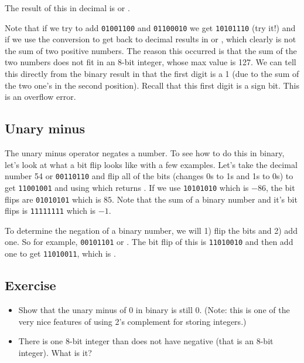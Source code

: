 The result of this in decimal is  or  \printpythontex[verb]. 


Note that if we try to add \verb!01001100! and \verb!01100010! we get \verb!10101110! (try it!) and if we use the conversion to get back to decimal results in  or  \printpythontex[verb], which clearly is not the sum of two positive numbers.  The reason this occurred is that the sum of the two numbers does not fit in an 8-bit integer, whose max value is 127.  We can tell this directly from the binary result in that the first digit is a 1 (due to the sum of the two one's in the second position).  Recall that this first digit is a sign bit.  This is an overflow error.  

\subsection{Unary minus}


The unary minus operator negates a number.  To see how to do this in binary, let's look at what a bit flip looks like with a few examples.  Let's take the decimal number 54 or \verb!00110110! and flip all of the bits (changes 0s to 1s and 1s to 0s) to get \verb!11001001! and using   which returns \printpythontex[verb]. If we use \verb!10101010! which is $-86$, the bit flips are \verb!01010101! which is $85$.  Note that the sum of a binary number and it's bit flips is \verb!11111111! which is $-1$. 

To determine the negation of a binary number, we will 1) flip the bits and 2) add one.  So for example, 
\verb!00101101! or  \printpythontex[verb].  The bit flip of this is \verb!11010010! and then add one to get \verb!11010011!, which is  \printpythontex[verb].


\subsection{Exercise}

\begin{itemize}
\item Show that the unary minus of 0 in binary is still 0.  (Note: this is one of the very nice features of using 2's complement for storing integers.)
\item There is one 8-bit integer than does not have negative (that is an 8-bit integer).  What is it? 
\end{itemize}

